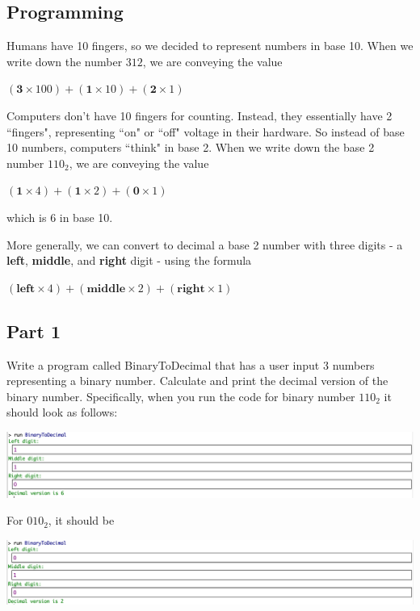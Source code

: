 \documentclass[answers,addpoints]{exam} %
\begin{document}
\begin{questions}

\section{Programming}

\question[5]

Humans have 10 fingers, so we decided to represent numbers in base 10. When we write down the number $312$, we are conveying the value 

$(\mathbf{3}\times 100) + (\mathbf{1} \times 10) + (\mathbf{2} \times 1)$

Computers don't have 10 fingers for counting. Instead, they essentially have 2 ``fingers", representing ``on" or ``off" voltage in their hardware. So instead of base 10 numbers, computers ``think" in base 2. When we write down the base 2 number $110_2$, we are conveying the value

$(\mathbf{1} \times 4) +( \mathbf{1} \times 2) + (\mathbf{0} \times 1)$

which is $6$ in base 10.

More generally, we can convert to decimal a base 2 number with three digits - a \textbf{left}, \textbf{middle}, and \textbf{right} digit - using the formula

$(\mathbf{left} \times 4) + (\mathbf{middle} \times 2) + (\mathbf{right} \times 1)$

\subsection{Part 1}
Write a program called BinaryToDecimal that has a user input 3 numbers representing a binary number. Calculate and print the decimal version of the binary number. Specifically, when you run the code for binary number $110_2$ it should look as follows: 

\includegraphics{binaryExample110}

For $010_2$, it should be 

\includegraphics{binaryExample010}


\end{questions}
\end{document}
